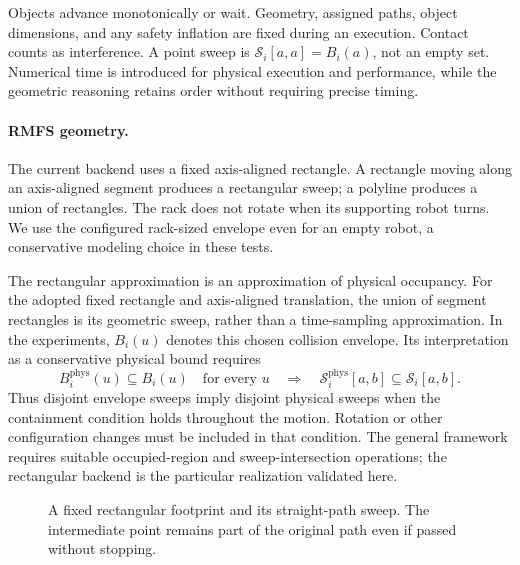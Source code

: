 \documentclass[11pt,a4paper]{article}
\theoremstyle{remark}
\newcommand{\Sw}{\mathcal S}
\begin{document}
Objects advance monotonically or wait. Geometry, assigned paths, object
dimensions, and any safety inflation are fixed during an execution.
Contact counts as interference. A point sweep is
$\Sw_i[a,a]=B_i(a)$, not an empty set.
Numerical time is introduced for physical execution and performance, while
the geometric reasoning retains order without requiring precise timing.

\paragraph{RMFS geometry.}
The current backend uses a fixed axis-aligned rectangle. A rectangle moving
along an axis-aligned segment produces a rectangular sweep; a polyline
produces a union of rectangles. The rack does not rotate when its supporting
robot turns. We use the configured rack-sized envelope even for an empty
robot, a conservative modeling choice in these tests.

The rectangular approximation is an approximation of physical occupancy.
For the adopted fixed rectangle and axis-aligned translation, the union of
segment rectangles is its geometric sweep, rather than a time-sampling
approximation. In the experiments, $B_i(u)$ denotes this chosen collision
envelope. Its interpretation as a conservative physical bound requires
\begin{equation}
 B_i^{\mathrm{phys}}(u)\subseteq B_i(u)\quad\text{for every }u
 \quad\Longrightarrow\quad
 \Sw_i^{\mathrm{phys}}[a,b]\subseteq\Sw_i[a,b].
 \label{eq:physical-envelope}
\end{equation}
Thus disjoint envelope sweeps imply disjoint physical sweeps when the
containment condition holds throughout the motion. Rotation or other
configuration changes must be included in that condition. The general
framework requires suitable occupied-region and sweep-intersection operations;
the rectangular backend is the particular realization validated here.

\begin{figure}[htbp]
\centering
{}
\caption{A fixed rectangular footprint and its straight-path sweep. The
intermediate point remains part of the original path even if passed without stopping.}
\label{fig:sweep}
\end{figure}
\end{document}
